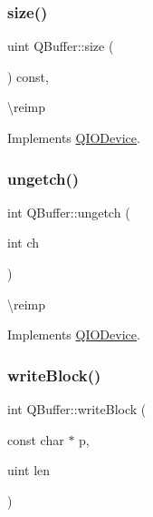 \subsubsection{\texorpdfstring{size()}{size()}}
{\footnotesize\ttfamily uint Q\+Buffer\+::size (\begin{DoxyParamCaption}{ }\end{DoxyParamCaption}) const\hspace{0.3cm}{\ttfamily [inline]}, {\ttfamily [virtual]}}

\textbackslash{}reimp 

Implements \mbox{\hyperlink{class_q_i_o_device_a60c4146763625213ac7aa29f1f071592}{Q\+I\+O\+Device}}.

\mbox{\label{class_q_buffer_a52f9ebc674d0651e6fd89e148529bb50}} 
\subsubsection{\texorpdfstring{ungetch()}{ungetch()}}
{\footnotesize\ttfamily int Q\+Buffer\+::ungetch (\begin{DoxyParamCaption}\item[{int}]{ch }\end{DoxyParamCaption})\hspace{0.3cm}{\ttfamily [virtual]}}

\textbackslash{}reimp 

Implements \mbox{\hyperlink{class_q_i_o_device_aae3d67422103e8fc0411297b1d62c29a}{Q\+I\+O\+Device}}.

\mbox{\label{class_q_buffer_ad8bdac07e525a782d0759d3082bb296a}} 
\subsubsection{\texorpdfstring{writeBlock()}{writeBlock()}}
{\footnotesize\ttfamily int Q\+Buffer\+::write\+Block (\begin{DoxyParamCaption}\item[{const char $\ast$}]{p,  }\item[{uint}]{len }\end{DoxyParamCaption})\hspace{0.3cm}{\ttfamily [virtual]}}

